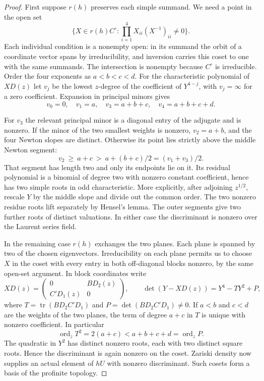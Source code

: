\begin{proof}
First suppose \(r(h)\) preserves each simple summand. We need a point in the open set
\[
  \{X\in r(h)C^\circ:\prod_{i=1}^4 X_{ii}(X^{-1})_{ii}\ne0\}.
\] Each individual condition is a nonempty
open: in its summand the orbit of a coordinate vector spans by
irreducibility, and inversion carries this coset to one with
the same summands. The intersection is nonempty because
\(C^\circ\) is irreducible. Order the four exponents as
\(a<b<c<d\). For the characteristic polynomial of \(XD(z)\) let
\(v_j\) be the lowest \(z\)-degree of the coefficient of
\(Y^{4-j}\), with \(v_j=\infty\) for a zero coefficient. Expansion
in principal minors gives
\[
 v_0=0,\quad v_1=a,\quad v_3=a+b+c,\quad
 v_4=a+b+c+d .
\]

For \(v_3\) the relevant principal minor is a diagonal entry of the
adjugate and is nonzero. If the minor of the two smallest weights
is nonzero, \(v_2=a+b\), and the four Newton slopes are distinct.
Otherwise its point lies strictly above the middle Newton segment:
\[
             v_2\ \ge\ a+c\ >\ a+(b+c)/2=(v_1+v_3)/2 .
\]
That segment has length two and only its endpoints lie on it. Its residual polynomial
is a binomial of degree two with nonzero constant coefficient, hence
has two simple roots in odd characteristic. More explicitly, after
adjoining \(z^{1/2}\), rescale \(Y\) by the middle slope and
divide out the common order. The two nonzero residue roots lift
separately by Hensel's lemma. The outer segments give two further
roots of distinct valuations. In either case the discriminant is
nonzero over the Laurent series field.

In the remaining case \(r(h)\) exchanges the two planes. Each plane
is spanned by two of the chosen eigenvectors. Irreducibility on
each plane permits us to choose \(X\) in the coset with every
entry in both off-diagonal blocks nonzero, by the same open-set
argument. In block coordinates write
\[
 XD(z)=\begin{pmatrix}0&B D_2(z)\\ C' D_1(z)&0\end{pmatrix},
 \qquad
 \det(Y-XD(z))=Y^4-TY^2+P,
\]
where \(T=\operatorname{tr}(B D_2 C'D_1)\) and
\(P=\det(B D_2 C'D_1)\ne0\). If \(a<b\) and \(c<d\) are the
weights of the two planes, the term of degree \(a+c\) in \(T\)
is unique with nonzero coefficient. In particular
\[
 \operatorname{ord}_z T^2=2(a+c)<a+b+c+d=\operatorname{ord}_z P .
\]
The quadratic in \(Y^2\) has distinct nonzero roots, each with
two distinct square roots. Hence the discriminant is again
nonzero on the coset. Zariski density now supplies an actual
element of \(hU\) with nonzero discriminant. Such cosets form a
basis of the profinite topology.
\end{proof}

